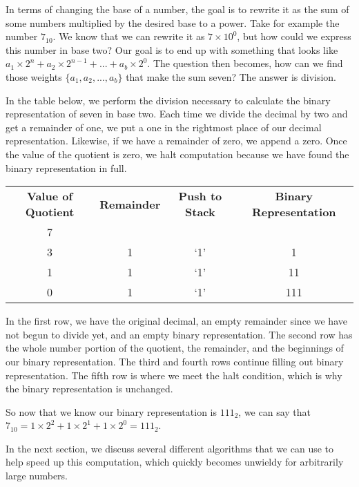 \documentclass[12pt]{article}
\begin{document}
\par In terms of changing the base of a number, the goal is to rewrite it as the sum of some numbers multiplied by the desired base to a power. Take for example the number $7_{10}$. We know that we can rewrite it as $7\times10^0$, but how could we express this number in base two? Our goal is to end up with something that looks like $a_1\times2^{n} + a_2\times2^{n-1} + ... + a_b\times2^0$. The question then becomes, how can we find those weights $\{a_1, a_2, ..., a_b\}$ that make the sum seven? The answer is division.

\par In the table below, we perform the division necessary to calculate the binary representation of seven in base two. Each time we divide the decimal by two and get a remainder of one, we put a one in the rightmost place of our decimal representation. Likewise, if we have a remainder of zero, we append a zero. Once the value of the quotient is zero, we halt computation because we have found the binary representation in full.

\begin{center}
  \begin{tabular}{c|c|c|c}
    \textbf{Value of Quotient} & \textbf{Remainder} & \textbf{Push to Stack} & \textbf{Binary Representation} \\
    7 &   &     & \\
    3 & 1 & `1' & 1 \\
    1 & 1 & `1' & 11 \\
    0 & 1 & `1' & 111
  \end{tabular}
\end{center}

\par In the first row, we have the original decimal, an empty remainder since we have not begun to divide yet, and an empty binary representation. The second row has the whole number portion of the quotient, the remainder, and the beginnings of our binary representation. The third and fourth rows continue filling out binary representation. The fifth row is where we meet the halt condition, which is why the binary representation is unchanged.

\par So now that we know our binary representation is $111_2$, we can say that $7_{10} = 1\times2^2+1\times2^1+1\times2^0 = 111_2$.

\par In the next section, we discuss several different algorithms that we can use to help speed up this computation, which quickly becomes unwieldy for arbitrarily large numbers.
\end{document}

